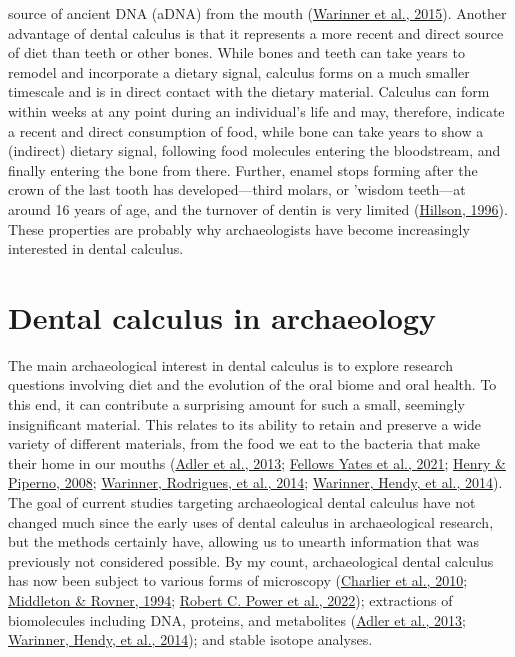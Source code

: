 \documentclass[
  b5paper,
]{book}
\begin{document}
source of ancient DNA (aDNA) from the mouth
(\protect\hyperlink{ref-warinnerNewEra2015}{Warinner et al., 2015}).
Another advantage of dental calculus is that it represents a more recent
and direct source of diet than teeth or other bones. While bones and
teeth can take years to remodel and incorporate a dietary signal,
calculus forms on a much smaller timescale and is in direct contact with
the dietary material. Calculus can form within weeks at any point during
an individual's life and may, therefore, indicate a recent and direct
consumption of food, while bone can take years to show a (indirect)
dietary signal, following food molecules entering the bloodstream, and
finally entering the bone from there. Further, enamel stops forming
after the crown of the last tooth has developed---third molars, or
'wisdom teeth---at around 16 years of age, and the turnover of dentin is
very limited
(\protect\hyperlink{ref-hillsonDentalAnthropology1996}{Hillson, 1996}).
These properties are probably why archaeologists have become
increasingly interested in dental calculus.

\hypertarget{intro-arch}{%
\section{Dental calculus in archaeology}\label{intro-arch}}

The main archaeological interest in dental calculus is to explore
research questions involving diet and the evolution of the oral biome
and oral health. To this end, it can contribute a surprising amount for
such a small, seemingly insignificant material. This relates to its
ability to retain and preserve a wide variety of different materials,
from the food we eat to the bacteria that make their home in our mouths
(\protect\hyperlink{ref-adlerSequencingAncient2013}{Adler et al., 2013};
\protect\hyperlink{ref-yatesOralMicrobiome2021}{Fellows Yates et al.,
2021}; \protect\hyperlink{ref-henryCalculusSyria2008}{Henry \& Piperno,
2008}; \protect\hyperlink{ref-warinnerPathogensHost2014}{Warinner,
Rodrigues, et al., 2014};
\protect\hyperlink{ref-warinnerEvidenceMilk2014}{Warinner, Hendy, et
al., 2014}). The goal of current studies targeting archaeological dental
calculus have not changed much since the early uses of dental calculus
in archaeological research, but the methods certainly have, allowing us
to unearth information that was previously not considered possible. By
my count, archaeological dental calculus has now been subject to various
forms of microscopy
(\protect\hyperlink{ref-charlierSEMCalculus2010}{Charlier et al., 2010};
\protect\hyperlink{ref-middletonOpalPhytoliths1994}{Middleton \& Rovner,
1994}; \protect\hyperlink{ref-powerSynchrotronRadiationbased2022}{Robert
C. Power et al., 2022}); extractions of biomolecules including DNA,
proteins, and metabolites
(\protect\hyperlink{ref-adlerSequencingAncient2013}{Adler et al., 2013};
\protect\hyperlink{ref-warinnerEvidenceMilk2014}{Warinner, Hendy, et
al., 2014}); and stable isotope analyses.
\end{document}
